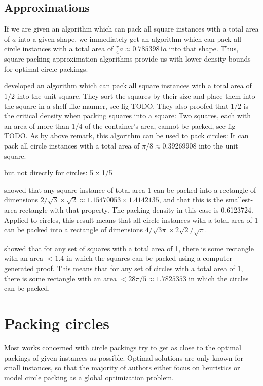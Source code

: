 \documentclass[a4paper,style=print,bibliography=totoc,nexus,lnum,extramargin]{tubsbook}
\begin{document}
\subsection{Approximations}

If we are given an algorithm which can pack all square instances with a total area of $a$ into a given shape, we immediately get an algorithm which can pack all circle instances with a total area of $\frac{\pi}{4}a \approx 0.7853981a$ into that shape. Thus, square packing approximation algorithms provide us with lower density bounds for optimal circle packings.

\textcite{MM1967some} developed an algorithm which can pack all square instances with a total area of $1/2$ into the unit square.
They sort the squares by their size and place them into the square in a shelf-like manner, see fig TODO.
They also proofed that $1/2$ is the critical density when packing squares into a square: Two squares, each with an area of more than $1/4$ of the container's area, cannot be packed, see fig TODO.
As by above remark, this algorithm can be used to pack circles: It can pack all circle instances with a total area of $\pi/8 \approx 0.39269908$ into the unit square.

but not directly for circles: 5 x 1/5

\textcite{KK1975optimal} showed that any square instance of total area 1 can be packed into a rectangle of dimensions $2/\sqrt{3} \times \sqrt{2} \approx 1.15470053 \times 1.4142135$, and that this is the smallest-area rectangle with that property. The packing density in this case is 0.6123724. Applied to circles, this result means that all circle instances with a total area of 1 can be packed into a rectangle of dimensions $4/\sqrt{3\pi} \times 2\sqrt{2}/\sqrt{\pi}$.

\textcite{hougardy2011packing} showed that for any set of squares with a total area of 1, there is some rectangle with an area $< 1.4$ in which the squares can be packed using a computer generated proof. This means that for any set of circles with a total area of 1, there is some rectangle with an area $< 28\pi/5 \approx 1.7825353$ in which the circles can be packed.

\section{Packing circles}

Most works concerned with circle packings try to get as close to the optimal packings of given instances as possible. Optimal solutions are only known for small instances, so that the majority of authors either focus on heuristics or model circle packing as a global optimization problem.
\end{document}
